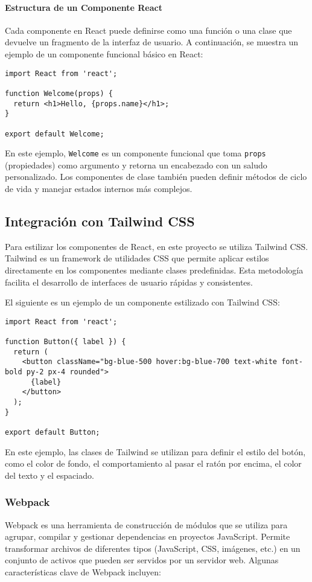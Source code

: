 \paragraph{Estructura de un Componente React}
Cada componente en React puede definirse como una función o una clase que devuelve un fragmento de la interfaz de usuario. A continuación, se muestra un ejemplo de un componente funcional básico en React:

\begin{verbatim}
import React from 'react';

function Welcome(props) {
  return <h1>Hello, {props.name}</h1>;
}

export default Welcome;
\end{verbatim}

En este ejemplo, \texttt{Welcome} es un componente funcional que toma \texttt{props} (propiedades) como argumento y retorna un encabezado con un saludo personalizado. Los componentes de clase también pueden definir métodos de ciclo de vida y manejar estados internos más complejos.

\subsection{Integración con Tailwind CSS}
Para estilizar los componentes de React, en este proyecto se utiliza Tailwind CSS. Tailwind es un framework de utilidades CSS que permite aplicar estilos directamente en los componentes mediante clases predefinidas. Esta metodología facilita el desarrollo de interfaces de usuario rápidas y consistentes.

El siguiente es un ejemplo de un componente estilizado con Tailwind CSS:

\begin{verbatim}
import React from 'react';

function Button({ label }) {
  return (
    <button className="bg-blue-500 hover:bg-blue-700 text-white font-bold py-2 px-4 rounded">
      {label}
    </button>
  );
}

export default Button;
\end{verbatim}

En este ejemplo, las clases de Tailwind se utilizan para definir el estilo del botón, como el color de fondo, el comportamiento al pasar el ratón por encima, el color del texto y el espaciado.

\subsubsection{Webpack}
Webpack es una herramienta de construcción de módulos que se utiliza para agrupar, compilar y gestionar dependencias en proyectos JavaScript. Permite transformar archivos de diferentes tipos (JavaScript, CSS, imágenes, etc.) en un conjunto de activos que pueden ser servidos por un servidor web. Algunas características clave de Webpack incluyen:

